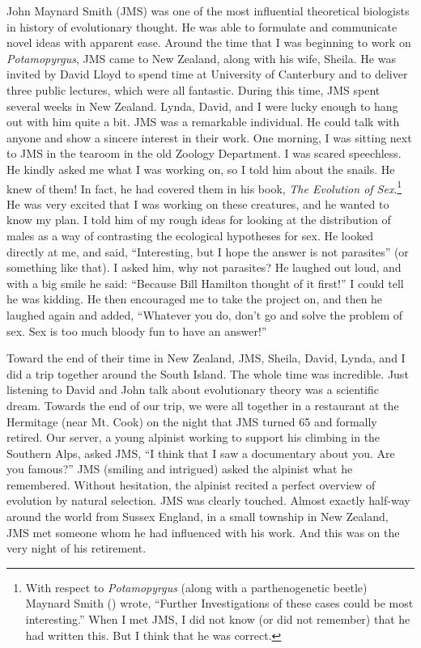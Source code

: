 \documentclass[
  letterpaper,
]{book}
\begin{document}
John Maynard Smith (JMS) was one of the most influential theoretical
biologists in history of evolutionary thought. He was able to formulate
and communicate novel ideas with apparent ease. Around the time that I
was beginning to work on \emph{Potamopyrgus}, JMS came to New Zealand,
along with his wife, Sheila. He was invited by David Lloyd to spend time
at University of Canterbury and to deliver three public lectures, which
were all fantastic. During this time, JMS spent several weeks in New
Zealand. Lynda, David, and I were lucky enough to hang out with him
quite a bit. JMS was a remarkable individual. He could talk with anyone
and show a sincere interest in their work. One morning, I was sitting
next to JMS in the tearoom in the old Zoology Department. I was scared
speechless. He kindly asked me what I was working on, so I told him
about the snails. He knew of them! In fact, he had covered them in his
book, \emph{The Evolution of Sex}.\footnote{With respect to
  \emph{Potamopyrgus} (along with a parthenogenetic beetle) Maynard
  Smith () wrote, ``Further
  Investigations of these cases could be most interesting.'' When I met
  JMS, I did not know (or did not remember) that he had written this.
  But I think that he was correct.} He was very excited that I was
working on these creatures, and he wanted to know my plan. I told him of
my rough ideas for looking at the distribution of males as a way of
contrasting the ecological hypotheses for sex. He looked directly at me,
and said, ``Interesting, but I hope the answer is not parasites'' (or
something like that). I asked him, why not parasites? He laughed out
loud, and with a big smile he said: ``Because Bill Hamilton thought of
it first!'' I could tell he was kidding. He then encouraged me to take
the project on, and then he laughed again and added, ``Whatever you do,
don't go and solve the problem of sex. Sex is too much bloody fun to
have an answer!''

Toward the end of their time in New Zealand, JMS, Sheila, David, Lynda,
and I did a trip together around the South Island. The whole time was
incredible. Just listening to David and John talk about evolutionary
theory was a scientific dream. Towards the end of our trip, we were all
together in a restaurant at the Hermitage (near Mt. Cook) on the night
that JMS turned 65 and formally retired. Our server, a young alpinist
working to support his climbing in the Southern Alps, asked JMS, ``I
think that I saw a documentary about you. Are you famous?'' JMS (smiling
and intrigued) asked the alpinist what he remembered. Without
hesitation, the alpinist recited a perfect overview of evolution by
natural selection. JMS was clearly touched. Almost exactly half-way
around the world from Sussex England, in a small township in New
Zealand, JMS met someone whom he had influenced with his work. And this
was on the very night of his retirement.
\end{document}
